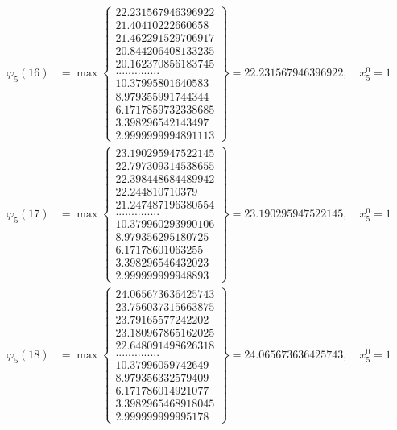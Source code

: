 \documentclass{article}
\begin{document}
\begin{align*}
  
  
  
\varphi_{5}(16) &= \max \left\{ \begin{array}{c}
22.231567946396922 \\
 21.40410222660658 \\
 21.462291529706917 \\
 20.844206408133235 \\
 20.162370856183745 \\
 .............. \\
 10.37995801640583 \\
 8.979355991744344 \\
 6.1717859732338685 \\
 3.398296542143497 \\
 2.9999999994891113
\end{array} \right\} = 22.231567946396922, \quad x_{5}^0 = 1\\
  
  
  
  
\varphi_{5}(17) &= \max \left\{ \begin{array}{c}
23.190295947522145 \\
 22.797309314538655 \\
 22.398448684489942 \\
 22.244810710379 \\
 21.247487196380554 \\
 .............. \\
 10.379960293990106 \\
 8.979356295180725 \\
 6.17178601063255 \\
 3.398296546432023 \\
 2.999999999948893
\end{array} \right\} = 23.190295947522145, \quad x_{5}^0 = 1\\
  
  
  
  
\varphi_{5}(18) &= \max \left\{ \begin{array}{c}
24.065673636425743 \\
 23.756037315663875 \\
 23.79165577242202 \\
 23.180967865162025 \\
 22.648091498626318 \\
 .............. \\
 10.37996059742649 \\
 8.979356332579409 \\
 6.171786014921077 \\
 3.3982965468918045 \\
 2.999999999995178
\end{array} \right\} = 24.065673636425743, \quad x_{5}^0 = 1\\
  

\end{align*}
\end{document}
